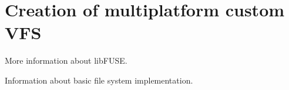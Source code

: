 \chapter{Creation of multiplatform custom VFS}
\label{chap:math}

More information about libFUSE.

Information about basic file system implementation.